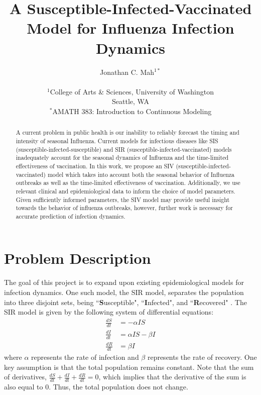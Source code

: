 \documentclass[11pt]{article}
\title{A Susceptible-Infected-Vaccinated Model for Influenza Infection Dynamics}
\author
{Jonathan C. Mah$^{1*}$\\
\\
\footnotesize{$^1$College of Arts \& Sciences, University of Washington}\\
\footnotesize{Seattle, WA}\\
\footnotesize{$^*$AMATH 383: Introduction to Continuous Modeling}\\
}
\date{}
\begin{document}
 


\maketitle 


\begin{abstract}
\noindent  
A current problem in public health is our inability to reliably forecast the timing and intensity of seasonal Influenza. Current models for infectious diseases like SIS (susceptible-infected-susceptible) and SIR (susceptible-infected-vaccinated) models inadequately account for the seasonal dynamics of Influenza and the time-limited effectiveness of vaccination. In this work, we propose an SIV (susceptible-infected-vaccinated) model which takes into account both the seasonal behavior of Influenza outbreaks as well as the time-limited effectiveness of vaccination. Additionally, we use relevant clinical and epidemiological data to inform the choice of model parameters. Given sufficiently informed parameters, the SIV model may provide useful insight towards the behavior of influenza outbreaks, however, further work is necessary for accurate prediction of infection dynamics.
\end{abstract}

\clearpage

\section*{Problem Description} 

The goal of this project is to expand upon existing epidemiological models for infection dynamics. One such model, the SIR model, separates the population into three disjoint sets, being ``\textbf{S}usceptible", ``\textbf{I}nfected", and ``\textbf{R}ecovered" \citep{Beretta1995}. The SIR model is given by the following system of differential equations:
\begin{equation} \label{SIR}
\begin{aligned}
\frac{dS}{dt} &= -\alpha I S \\
\frac{dI}{dt} &= \alpha I S - \beta I \\
\frac{dR}{dt} &= \beta I 
\end{aligned}
\end{equation}
where $\alpha$ represents the rate of infection and $\beta$ represents the rate of recovery. One key assumption is that the total population remains constant. Note that the sum of derivatives, $\frac{dS}{dt} + \frac{dI}{dt} + \frac{dR}{dt} = 0$, which implies that the derivative of the sum is also equal to $0$. Thus, the total population does not change. 
\end{document}
